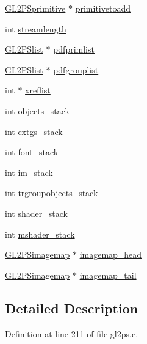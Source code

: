 \begin{DoxyCompactItemize}
\item 
\hyperlink{struct_g_l2_p_sprimitive}{G\+L2\+P\+Sprimitive} $\ast$ \hyperlink{struct_g_l2_p_scontext_a72d1e9da86c97a3b6e366dd0ee85e85b}{primitivetoadd}
\item 
int \hyperlink{struct_g_l2_p_scontext_ac18da171d9e16e62f816c3b7370ce060}{streamlength}
\item 
\hyperlink{struct_g_l2_p_slist}{G\+L2\+P\+Slist} $\ast$ \hyperlink{struct_g_l2_p_scontext_acab98dc143b241b9fff8ec6b66b490be}{pdfprimlist}
\item 
\hyperlink{struct_g_l2_p_slist}{G\+L2\+P\+Slist} $\ast$ \hyperlink{struct_g_l2_p_scontext_a25a5e8b6faa99f105a2b259550863fb1}{pdfgrouplist}
\item 
int $\ast$ \hyperlink{struct_g_l2_p_scontext_ae9e5f2fb03b2de75f3c96c7eefaca9c8}{xreflist}
\item 
int \hyperlink{struct_g_l2_p_scontext_a30c61b73e7387fe53aa24d7e56ccdb43}{objects\+\_\+stack}
\item 
int \hyperlink{struct_g_l2_p_scontext_a9ba7595503ea6bc68d1ad39b02ec20c5}{extgs\+\_\+stack}
\item 
int \hyperlink{struct_g_l2_p_scontext_a69779f964edcdd9fc734f7e301328363}{font\+\_\+stack}
\item 
int \hyperlink{struct_g_l2_p_scontext_a5b14e3c2ba9f96921e5592a441f2c54d}{im\+\_\+stack}
\item 
int \hyperlink{struct_g_l2_p_scontext_a07c002428c9a4bc607c0ae2db2ca5524}{trgroupobjects\+\_\+stack}
\item 
int \hyperlink{struct_g_l2_p_scontext_a46bb1de926cfd28ae8318ce99b5b0930}{shader\+\_\+stack}
\item 
int \hyperlink{struct_g_l2_p_scontext_a46a14f06038a92b3cf5bb929b066a4b8}{mshader\+\_\+stack}
\item 
\hyperlink{gl2ps_8c_a12e221903db330081b8f4f9f193f3bd4}{G\+L2\+P\+Simagemap} $\ast$ \hyperlink{struct_g_l2_p_scontext_a1fe935723116b751c65a1f9b170366df}{imagemap\+\_\+head}
\item 
\hyperlink{gl2ps_8c_a12e221903db330081b8f4f9f193f3bd4}{G\+L2\+P\+Simagemap} $\ast$ \hyperlink{struct_g_l2_p_scontext_a2b46299e500bbcb64d6ef437b113ea07}{imagemap\+\_\+tail}
\end{DoxyCompactItemize}


\subsection{Detailed Description}


Definition at line 211 of file gl2ps.\+c.




